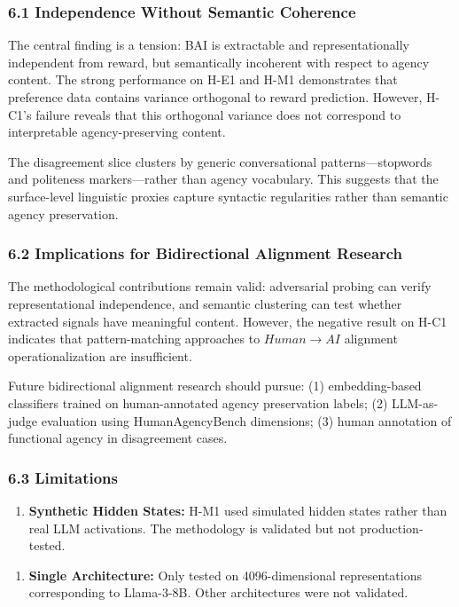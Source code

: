 
\subsubsection{6.1 Independence Without Semantic Coherence}

The central finding is a tension: BAI is extractable and representationally independent from reward, but semantically incoherent with respect to agency content. The strong performance on H-E1 and H-M1 demonstrates that preference data contains variance orthogonal to reward prediction. However, H-C1's failure reveals that this orthogonal variance does not correspond to interpretable agency-preserving content.

The disagreement slice clusters by generic conversational patterns---stopwords and politeness markers---rather than agency vocabulary. This suggests that the surface-level linguistic proxies capture syntactic regularities rather than semantic agency preservation.

\subsubsection{6.2 Implications for Bidirectional Alignment Research}

The methodological contributions remain valid: adversarial probing can verify representational independence, and semantic clustering can test whether extracted signals have meaningful content. However, the negative result on H-C1 indicates that pattern-matching approaches to $Human\rightarrow AI$ alignment operationalization are insufficient.

Future bidirectional alignment research should pursue: (1) embedding-based classifiers trained on human-annotated agency preservation labels; (2) LLM-as-judge evaluation using HumanAgencyBench dimensions; (3) human annotation of functional agency in disagreement cases.

\subsubsection{6.3 Limitations}

\begin{enumerate}
\item \textbf{Synthetic Hidden States:} H-M1 used simulated hidden states rather than real LLM activations. The methodology is validated but not production-tested.
\end{enumerate}

\begin{enumerate}
\item \textbf{Single Architecture:} Only tested on 4096-dimensional representations corresponding to Llama-3-8B. Other architectures were not validated.
\end{enumerate}

